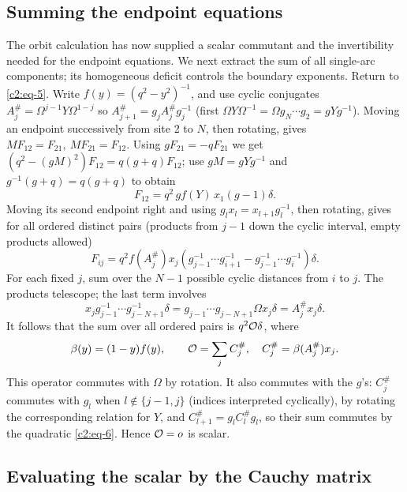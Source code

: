 \subsection{Summing the endpoint equations}

The orbit calculation has now supplied a scalar commutant and the invertibility needed for the endpoint equations. We next extract the sum of all single-arc components; its homogeneous deficit controls the boundary exponents. Return to \eqref{c2:eq-5}. Write \(f(y)=(q^2-y^2)^{-1}\), and use cyclic conjugates \(A_j^\#=\Omega^{j-1}Y\Omega^{1-j}\) so
\(A_{j+1}^\#=g_j A_j^\# g_j^{-1}\) (first \(\Omega Y\Omega^{-1}=\Omega g_N\cdots g_2=gYg^{-1}\)). Moving an endpoint successively from site 2 to \(N\), then rotating, gives \(M F_{12}=F_{21},\ M F_{21}=F_{12}\). Using \(g F_{21}=-qF_{21}\) we get
\((q^2-(gM)^2)F_{12}=q(g+q)F_{12}\); use \(gM=gYg^{-1}\) and \(g^{-1}(g+q)=q(g+q)\) to obtain
\[
 F_{12}=q^2\,g f(Y)\,x_1(g-1)\delta.
\]
Moving its second endpoint right and using \(g_l x_l=x_{l+1}g_l^{-1}\), then rotating, gives for all ordered distinct pairs (products from \(j-1\) down the cyclic interval, empty products allowed)
\[
 F_{ij}
 =q^2 f(A_j^\#) x_j
 (g_{j-1}^{-1}\cdots g_{i+1}^{-1}-g_{j-1}^{-1}\cdots g_i^{-1})\delta.
\]
For each fixed $j$, sum over the $N-1$ possible cyclic distances from
$i$ to $j$.  The products telescope; the last term involves
\[
 x_j g_{j-1}^{-1}\cdots g_{j-N+1}^{-1}\delta
 =g_{j-1}\cdots g_{j-N+1}\Omega x_j\delta=A_j^\# x_j\delta .
\]
It follows that the sum over all ordered pairs is \(q^2 {\cal O}\delta\), where
\[
 \beta(y)=(1-y)f(y),\qquad {\cal O}=\sum_j C_j^\#,\quad C_j^\#=\beta(A_j^\#)x_j .
\]
This operator commutes with \(\Omega\) by rotation. It also commutes with the \(g\)'s: $C_j^\#$ commutes with $g_l$ when $l\notin\{j-1,j\}$
(indices interpreted cyclically), by rotating the corresponding relation
for $Y$, and \(C_{l+1}^\#=g_l C_l^\# g_l\), so their sum commutes by the quadratic \eqref{c2:eq-6}. Hence \({\cal O}=o\) is scalar.

\subsection{Evaluating the scalar by the Cauchy matrix}

